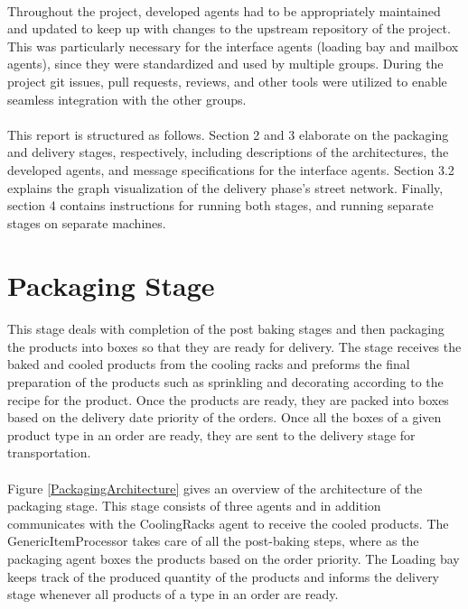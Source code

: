 \documentclass[11pt, a4paper]{article}
\begin{document}
\paragraph{}
Throughout the project, developed agents had to be appropriately maintained and updated to keep up with changes to the upstream repository of the project. This was particularly necessary for the interface agents (loading bay and mailbox agents), since they were standardized and used by multiple groups. During the project git issues, pull requests, reviews, and other tools were utilized to enable seamless integration with the other groups.

\paragraph{}
This report is structured as follows. Section 2 and 3 elaborate on the packaging and delivery stages, respectively, including descriptions of the architectures, the developed agents, and message specifications for the interface agents. Section 3.2 explains the graph visualization of the delivery phase's street network. Finally, section 4 contains instructions for running both stages, and running separate stages on separate machines.

\section{Packaging Stage}\label{PackagingStage}
\paragraph{}
This stage deals with completion of the post baking stages and then packaging the products into boxes so that they are ready for delivery. The stage receives the baked and cooled products from the cooling racks and preforms the final preparation of the products such as sprinkling and decorating according to the recipe for the product. Once the products are ready, they are packed into boxes based on the delivery date priority of the orders. Once all the boxes of a given product type in an order are ready, they are sent to the delivery stage for transportation.

\paragraph{}
Figure \ref{PackagingArchitecture} gives an overview of the architecture of the packaging stage. This stage consists of three agents and in addition communicates with the CoolingRacks agent to receive the cooled products. The GenericItemProcessor takes care of all the post-baking steps, where as the packaging agent boxes the products based on the order priority. The Loading bay keeps track of the produced quantity of the products and informs the delivery stage whenever all products of a type in an order are ready.
\end{document}
